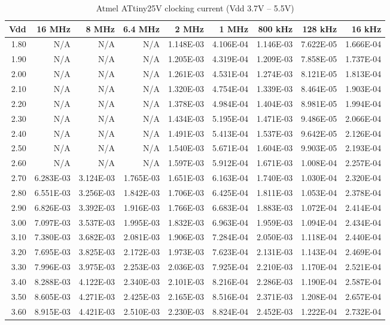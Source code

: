 \begin{table}
\begin{centering}
\begin{tabular}{|r|r|r|r|r|r|r|r|r|}
\hline
Vdd  & 16 MHz  & 8 MHz  & 6.4 MHz  & 2 MHz  & 1 MHz  & 800 kHz  & 128 kHz  & 16 kHz \tabularnewline
\hline
1.80  & N/A  & N/A  & N/A  & 1.148E-03  & 4.106E-04  & 1.146E-03  & 7.622E-05  & 1.666E-04 \tabularnewline
1.90  & N/A  & N/A  & N/A  & 1.205E-03  & 4.319E-04  & 1.209E-03  & 7.858E-05  & 1.737E-04 \tabularnewline
2.00  & N/A  & N/A  & N/A  & 1.261E-03  & 4.531E-04  & 1.274E-03  & 8.121E-05  & 1.813E-04 \tabularnewline
2.10  & N/A  & N/A  & N/A  & 1.320E-03  & 4.754E-04  & 1.339E-03  & 8.464E-05  & 1.903E-04 \tabularnewline
2.20  & N/A  & N/A  & N/A  & 1.378E-03  & 4.984E-04  & 1.404E-03  & 8.981E-05  & 1.994E-04 \tabularnewline
2.30  & N/A  & N/A  & N/A  & 1.434E-03  & 5.195E-04  & 1.471E-03  & 9.486E-05  & 2.066E-04 \tabularnewline
2.40  & N/A  & N/A  & N/A  & 1.491E-03  & 5.413E-04  & 1.537E-03  & 9.642E-05  & 2.126E-04 \tabularnewline
2.50  & N/A  & N/A  & N/A  & 1.540E-03  & 5.671E-04  & 1.604E-03  & 9.903E-05  & 2.193E-04 \tabularnewline
2.60  & N/A  & N/A  & N/A  & 1.597E-03  & 5.912E-04  & 1.671E-03  & 1.008E-04  & 2.257E-04 \tabularnewline
2.70  & 6.283E-03  & 3.124E-03  & 1.765E-03  & 1.651E-03  & 6.163E-04  & 1.740E-03  & 1.030E-04  & 2.320E-04 \tabularnewline
2.80  & 6.551E-03  & 3.256E-03  & 1.842E-03  & 1.706E-03  & 6.425E-04  & 1.811E-03  & 1.053E-04  & 2.378E-04 \tabularnewline
2.90  & 6.826E-03  & 3.392E-03  & 1.916E-03  & 1.766E-03  & 6.683E-04  & 1.883E-03  & 1.072E-04  & 2.414E-04 \tabularnewline
3.00  & 7.097E-03  & 3.537E-03  & 1.995E-03  & 1.832E-03  & 6.963E-04  & 1.959E-03  & 1.094E-04  & 2.434E-04 \tabularnewline
3.10  & 7.380E-03  & 3.682E-03  & 2.081E-03  & 1.906E-03  & 7.284E-04  & 2.050E-03  & 1.118E-04  & 2.440E-04 \tabularnewline
3.20  & 7.695E-03  & 3.825E-03  & 2.172E-03  & 1.973E-03  & 7.623E-04  & 2.131E-03  & 1.143E-04  & 2.469E-04 \tabularnewline
3.30  & 7.996E-03  & 3.975E-03  & 2.253E-03  & 2.036E-03  & 7.925E-04  & 2.210E-03  & 1.170E-04  & 2.521E-04 \tabularnewline
3.40  & 8.288E-03  & 4.122E-03  & 2.340E-03  & 2.101E-03  & 8.216E-04  & 2.286E-03  & 1.190E-04  & 2.587E-04 \tabularnewline
3.50  & 8.605E-03  & 4.271E-03  & 2.425E-03  & 2.165E-03  & 8.516E-04  & 2.371E-03  & 1.208E-04  & 2.657E-04 \tabularnewline
3.60  & 8.915E-03  & 4.421E-03  & 2.510E-03  & 2.230E-03  & 8.824E-04  & 2.452E-03  & 1.222E-04  & 2.732E-04 \tabularnewline
\hline
\end{tabular}
\par\end{centering}
\caption{Atmel ATtiny25V clocking current (Vdd 3.7V -- 5.5V)}


\end{table}
